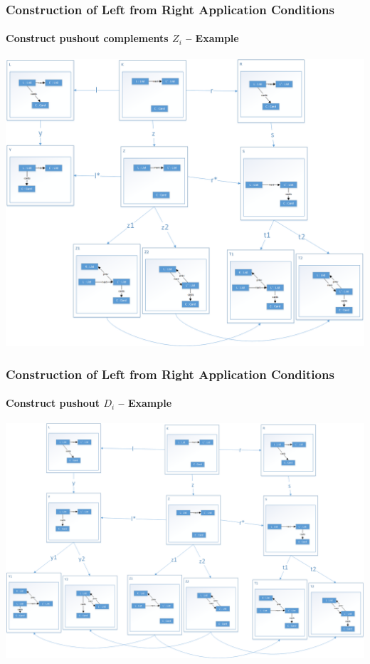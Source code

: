 \documentclass[32pt,t]{beamer}
\begin{document}
	\begin{frame}
		\frametitle{Construction of Left from Right Application Conditions}
		\framesubtitle{Construct pushout complements $Z_i$ -- Example}
		\centering
		\includegraphics[height=.8\textheight]{Images/54_RightAC-To-LeftAC_Example_Step4}
	\end{frame}

	\begin{frame}
		\frametitle{Construction of Left from Right Application Conditions}
		\framesubtitle{Construct pushout $D_i$ -- Example}
		\centering
		\includegraphics[height=.8\textheight]{Images/55_RightAC-To-LeftAC_Example_Step5}
	\end{frame}
\end{document}

